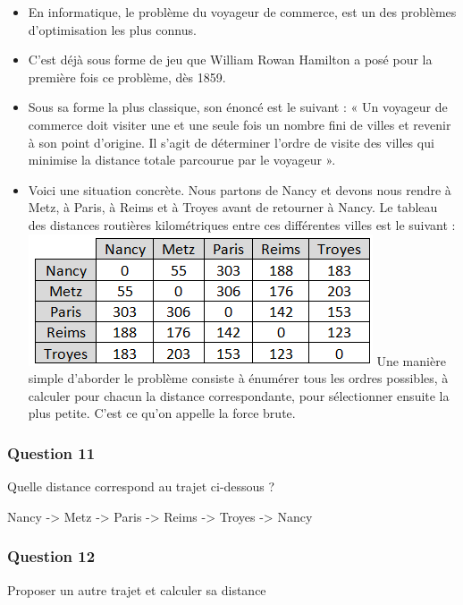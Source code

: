 \documentclass[
  paper=a4,
  ,captions=tableheading
]{scrartcl}
\providecommand{\tightlist}{%
  \setlength{\itemsep}{0pt}\setlength{\parskip}{0pt}}
\begin{document}
\begin{itemize}
\tightlist
\item
  En informatique, le problème du voyageur de commerce, est un des
  problèmes d'optimisation les plus connus.
\item
  C'est déjà sous forme de jeu que William Rowan Hamilton a posé pour la
  première fois ce problème, dès 1859.
\item
  Sous sa forme la plus classique, son énoncé est le suivant : « Un
  voyageur de commerce doit visiter une et une seule fois un nombre fini
  de villes et revenir à son point d'origine. Il s'agit de déterminer
  l'ordre de visite des villes qui minimise la distance totale parcourue
  par le voyageur ».
\item
  Voici une situation concrète. Nous partons de Nancy et devons nous
  rendre à Metz, à Paris, à Reims et à Troyes avant de retourner à
  Nancy. Le tableau des distances routières kilométriques entre ces
  différentes villes est le suivant :
  \includegraphics{images/5-image.png} Une manière simple d'aborder le
  problème consiste à énumérer tous les ordres possibles, à calculer
  pour chacun la distance correspondante, pour sélectionner ensuite la
  plus petite. C'est ce qu'on appelle la force brute.
\end{itemize}

\hypertarget{question-11}{%
\subsubsection{Question 11}\label{question-11}}

Quelle distance correspond au trajet ci-dessous ?

Nancy -\textgreater{} Metz -\textgreater{} Paris -\textgreater{} Reims
-\textgreater{} Troyes -\textgreater{} Nancy

\hypertarget{question-12}{%
\subsubsection{Question 12}\label{question-12}}

Proposer un autre trajet et calculer sa distance
\end{document}
